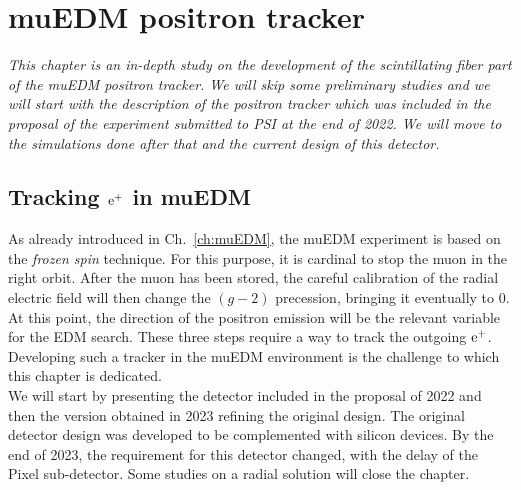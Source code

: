\chapter{muEDM positron tracker}
\label{ch:muEDM:tracker}
\begin{refsection}
{\itshape This chapter is an in-depth study on the development of the scintillating fiber part of the muEDM positron tracker. 
We will skip some preliminary studies and we will start with the description of the positron tracker which was included in the proposal of the experiment submitted to PSI at the end of 2022. We will move to the simulations done after that and the current design of this detector.}

\section{Tracking $\text{e}^+$ in muEDM}
    As already introduced in Ch.~\ref{ch:muEDM}, the muEDM experiment is based on the \textit{frozen spin} technique.
    For this purpose, it is cardinal to stop the muon in the right orbit. 
    After the muon has been stored, the careful calibration of the radial electric field will then change the $(g-2)$ precession, bringing it eventually to 0.
    At this point, the direction of the positron emission will be the relevant variable for the EDM search.
    These three steps require a way to track the outgoing $\text{e}^+$.
    Developing such a tracker in the muEDM environment is the challenge to which this chapter is dedicated.\\

    \noindent
    We will start by presenting the detector included in the proposal of 2022 and then the version obtained in 2023 refining the original design.
    The original detector design was developed to be complemented with silicon devices.
    By the end of 2023, the requirement for this detector changed, with the delay of the Pixel sub-detector. 
    Some studies on a radial solution will close the chapter.
    

\end{refsection}
